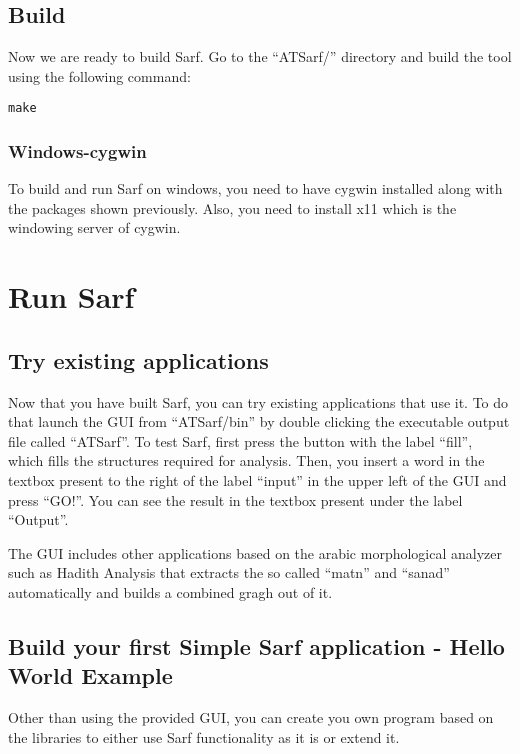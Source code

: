 \documentclass{article}
\begin{document}
\subsection{Build}
Now we are ready to build Sarf.
Go to the ``ATSarf/'' directory and build the tool using the following command:
\begin{verbatim}
make
\end{verbatim}

\subsubsection{Windows-cygwin}

To build and run Sarf on windows, you need to have cygwin installed along with the packages shown previously. Also, you need to install x11 which is the windowing server of cygwin.

\section{Run Sarf}

\subsection{Try existing applications}
Now that you have built Sarf, you can try existing applications that use it. To do that launch the GUI from ``ATSarf/bin'' by double clicking the executable output file called ``ATSarf''.
To test Sarf, first press the button with the label ``fill'', which fills the structures required for analysis. Then, you insert a word in the textbox present to the right of the label ``input'' in the upper left of the GUI and press ``GO!''. You can see the result in the textbox present under the label ``Output''.

The GUI includes other applications based on the arabic morphological analyzer such as Hadith Analysis that extracts the so called ``matn'' and ``sanad'' automatically and builds a combined gragh out of it. 


\subsection{Build your first Simple Sarf application - Hello World Example}
\label{subsec:hwex}

Other than using the provided GUI, you can create you own program based on the libraries to either use Sarf functionality as it is or extend it.
\end{document}
